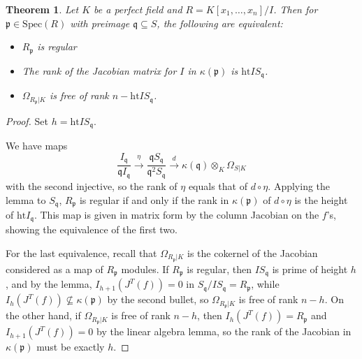 \documentclass{amsart}[12pt]
\newcommand{\htt}{\mathrm{ht}}
\newcommand{\Spec}{\mathrm{Spec}}
\newcommand{\fp}{{\mathfrak p}}
\newcommand{\fq}{{\mathfrak q}}
\numberwithin{equation}{section}
\theoremstyle{plain} %
\newtheorem{thm}[equation]{Theorem}
\theoremstyle{definition}
\theoremstyle{remark}
\newcommand{\xra}[1]{\xrightarrow{#1}}
\begin{document}
\begin{thm} Let $K$ be a perfect field and $R=K[x_1,\dots,x_n]/I$. Then for $\fp\in \Spec(R)$ with preimage $\fq\subseteq S$, the following are equivalent:
\begin{itemize}
\item $R_\fp$ is regular
\item The rank of the Jacobian matrix for $I$ in $\kappa(\fp)$ is $\htt I S_\fq$.
\item $\Omega_{R_\fp|K}$ is free of rank $n-\htt I S_\fq$.
\end{itemize}
\end{thm}
\begin{proof} Set $h=\htt I S_\fq$. 

We have maps
\[ \frac{I_\fq}{\fq I_\fq} \xra{\eta} \frac{\fq S_{\fq}}{\fq^2 S_{\fq}} \xra{d} \kappa(\fq) \otimes_K \Omega_{S|K}\]
with the second injective, so the rank of $\eta$ equals that of $d\circ \eta$. Applying the lemma to $S_\fq$, $R_\fp$ is regular if and only if the rank in $\kappa(\fp)$ of $d \circ \eta$ is the height of $\htt I_\fq$. This map is given in matrix form by the column Jacobian on the $f$'s, showing the equivalence of the first two.

 
For the last equivalence, recall that $\Omega_{R_\fp|K}$ is the cokernel of the Jacobian considered as a map of $R_\fp$ modules. If $R_{\fp}$ is regular, then $I S_\fq$ is prime of height $h$, and by the lemma, $I_{h+1}(J^T(f))=0$ in $S_\fq / I S_\fq = R_{\fp}$, while $I_h(J^T(f)) \not\subseteq \kappa(\fp)$ by the second bullet, so $\Omega_{R_{\fp}|K}$ is free of rank $n-h$. On the other hand, if $\Omega_{R_{\fp}|K}$ is free of rank $n-h$, then $I_h(J^T(f)) = R_{\fp}$ and $I_{h+1}(J^T(f))=0$ by the linear algebra lemma, so the rank of the Jacobian in $\kappa(\fp)$ must be exactly $h$.
\end{proof}
\end{document}
